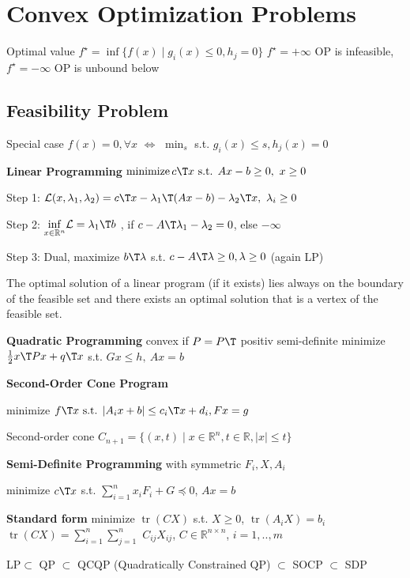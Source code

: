 \section{Convex Optimization Problems}

Optimal value $f^\star =
	\operatorname{inf}\{f(x)\mid
	g_i(x)\le0,h_j=0 \}$
$f^\star=+\infty$ OP is infeasible,
$f^\star=-\infty$ OP is unbound below

\subsection{Feasibility  Problem}


Special case $f(x)=0,\forall x$
$\Leftrightarrow$
$\min_s$ s.t. $g_i(x)\le s,h_j(x)=0$

\textbf{Linear Programming}
$ \operatorname{minimize} c\T x
	\text{ s.t. } Ax-b \ge 0,\ x\ge0$

Step 1:
$\mathcal{L}(x,\lambda_1,\lambda_2) =
	c\T x-\lambda_1\T (Ax-b) -\lambda_2\T x,\ \lambda_i \ge0$

Step 2:
$\underset{x \in \mathcal{\mathbb{R}}^n}{\operatorname{inf}}
	\mathcal{L}=\lambda_1\T b$
, if $c-A\T\lambda_1-\lambda_2=0$, else $-\infty$

Step 3: Dual,
maximize $b\T\lambda$
s.t.
$c-A\T\lambda\ge0,\lambda\ge0$
(again LP)

\begin{proposition}
	The optimal solution of a linear program (if it exists)
	lies always on the boundary of the feasible set
	and there exists an optimal solution that is a vertex of the feasible set.
\end{proposition}


\textbf{Quadratic Programming}
convex if $P=P\T$ positiv semi-definite
minimize $\frac{1}{2}x\T Px+q\T x$
s.t. $Gx\le h,\ Ax=b$


\textbf{Second-Order Cone Program}

minimize $f\T x \text{ s.t. }
	|A_ix+b|\le c_i\T x+d_i, Fx=g$

Second-order cone
$C_{n+1}=\{ (x,t)\mid
	x\in\mathbb{R}^{n}, t\in \mathbb{R}, |x|\le t \}$

\textbf{Semi-Definite Programming} with symmetric $F_i,X,A_i$

minimize $c\T x$
s.t.
$\sum_{i=1}^{n}x_iF_i+G\preceq0$,
$Ax=b$

\textbf{Standard form}
minimize $\operatorname{tr}(CX)$
s.t.
$X\ge0$,
$\operatorname{tr}(A_iX)=b_i$
$\operatorname{tr}(CX)=\sum_{i=1}^{n}\sum_{j=1}^{n}$
$C_{ij}X_{ij}$,
$C\in\mathbb{R}^{n\times n}$,
$i=1,..,m$

LP$\subset$ QP $\subset$ QCQP
\scriptsize
(Quadratically Constrained QP)
\footnotesize
$\subset$ SOCP $\subset$ SDP











